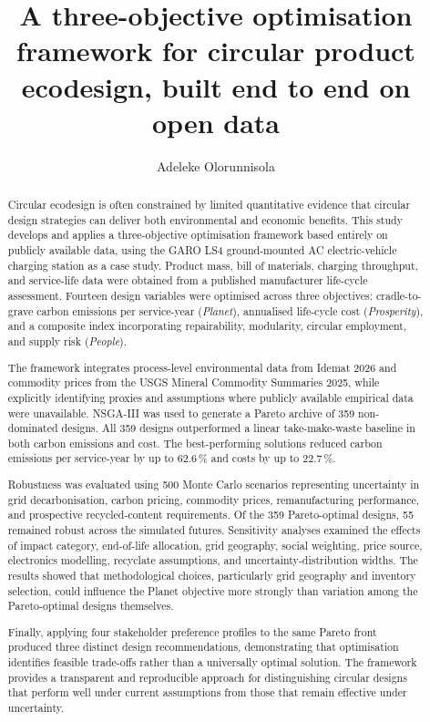 \documentclass[11pt,a4paper]{article}
\title{\Large\textbf{A three-objective optimisation framework for circular product\\
ecodesign, built end to end on open data}}
\author{Adeleke Olorunnisola}
\date{}
\begin{document}
\maketitle

\begin{abstract}
\noindent
Circular ecodesign is often constrained by limited quantitative evidence that
circular design strategies can deliver both environmental and economic
benefits. This study develops and applies a three-objective optimisation
framework based entirely on publicly available data, using the GARO LS4
ground-mounted AC electric-vehicle charging station as a case study. Product
mass, bill of materials, charging throughput, and service-life data were
obtained from a published manufacturer life-cycle assessment. Fourteen design
variables were optimised across three objectives: cradle-to-grave carbon
emissions per service-year (\emph{Planet}), annualised life-cycle cost
(\emph{Prosperity}), and a composite index incorporating repairability,
modularity, circular employment, and supply risk (\emph{People}).

The framework integrates process-level environmental data from Idemat 2026
and commodity prices from the USGS Mineral Commodity Summaries 2025, while
explicitly identifying proxies and assumptions where publicly available
empirical data were unavailable. NSGA-III was used to generate a Pareto
archive of 359 non-dominated designs. All 359 designs outperformed a linear
take-make-waste baseline in both carbon emissions and cost. The
best-performing solutions reduced carbon emissions per service-year by up to
62.6\,\% and costs by up to 22.7\,\%.

Robustness was evaluated using 500 Monte Carlo scenarios representing
uncertainty in grid decarbonisation, carbon pricing, commodity prices,
remanufacturing performance, and prospective recycled-content requirements.
Of the 359 Pareto-optimal designs, 55 remained robust across the simulated
futures. Sensitivity analyses examined the effects of impact category,
end-of-life allocation, grid geography, social weighting, price source,
electronics modelling, recyclate assumptions, and uncertainty-distribution
widths. The results showed that methodological choices, particularly grid
geography and inventory selection, could influence the Planet objective more
strongly than variation among the Pareto-optimal designs themselves.

Finally, applying four stakeholder preference profiles to the same Pareto
front produced three distinct design recommendations, demonstrating that
optimisation identifies feasible trade-offs rather than a universally optimal
solution. The framework provides a transparent and reproducible approach for
distinguishing circular designs that perform well under current assumptions
from those that remain effective under uncertainty.
\end{abstract}
\end{document}
